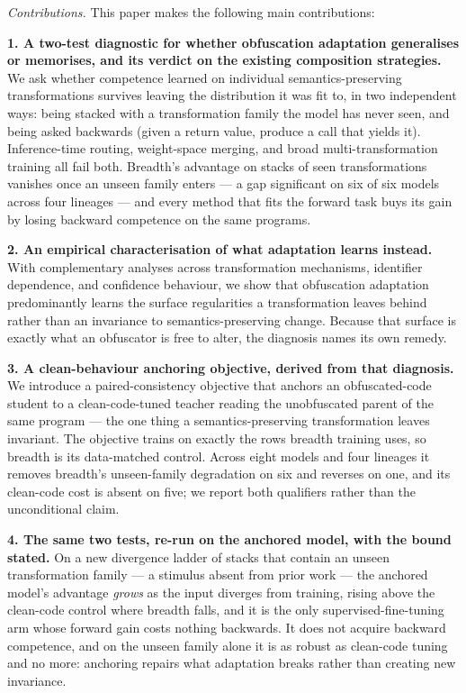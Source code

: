 {\em Contributions.} This paper makes the following main contributions:

\textbf{1. A two-test diagnostic for whether obfuscation adaptation generalises or
memorises, and its verdict on the existing composition strategies.}
    We ask whether competence learned on individual semantics-preserving transformations
    survives leaving the distribution it was fit to, in two independent ways: being stacked
    with a transformation family the model has never seen, and being asked backwards (given a
    return value, produce a call that yields it). Inference-time routing, weight-space
    merging, and broad multi-transformation training all fail both. Breadth's advantage on
    stacks of seen transformations vanishes once an unseen family enters --- a gap significant
    on six of six models across four lineages --- and every method that fits the forward task
    buys its gain by losing backward competence on the same programs.

\textbf{2. An empirical characterisation of what adaptation learns instead.}
    With complementary analyses across transformation mechanisms, identifier dependence, and
    confidence behaviour, we show that obfuscation adaptation predominantly learns the surface
    regularities a transformation leaves behind rather than an invariance to semantics-preserving
    change. Because that surface is exactly what an obfuscator is free to alter, the diagnosis
    names its own remedy.

\textbf{3. A clean-behaviour anchoring objective, derived from that diagnosis.}
    We introduce a paired-consistency objective that anchors an obfuscated-code student to a
    clean-code-tuned teacher reading the unobfuscated parent of the same program --- the one thing
    a semantics-preserving transformation leaves invariant. The objective trains on exactly the rows
    breadth training uses, so breadth is its data-matched control. Across eight models and four
    lineages it removes breadth's unseen-family degradation on six and reverses on one, and its
    clean-code cost is absent on five; we report both qualifiers rather than the unconditional
    claim.

\textbf{4. The same two tests, re-run on the anchored model, with the bound stated.}
    On a new divergence ladder of stacks that contain an unseen transformation family --- a
    stimulus absent from prior work --- the anchored model's advantage \emph{grows} as the input
    diverges from training, rising above the clean-code control where breadth falls, and it is the
    only supervised-fine-tuning arm whose forward gain costs nothing backwards. It does not acquire
    backward competence, and on the unseen family alone it is as robust as clean-code tuning and no
    more: anchoring repairs what adaptation breaks rather than creating new invariance.
